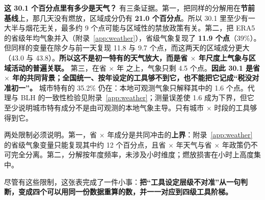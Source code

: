\textbf{这 30.1 个百分点里有多少是天气？} 有三条证据。第一，把同样的分解用在\textbf{节前基线}上，那几天没有燃放，区域成分仍有 \textbf{21.0 个百分点}。所以 30.1 里至少有一大半与烟花无关，最多约 9 个点可能与区域性的禁放政策有关。第二，把 ERA5 的省级年均气象并入（附录~\ref{app:weather}），省级气象复现了 \textbf{11.9 个点}（39\%）。但同样的变量在除夕与前一天复现 11.8 与 9.7 个点，而这两天的区域成分更大（43.0 与 43.8）。\textbf{所以这不是初一特有的天气放大，而是省 $\times$ 年尺度上气象与区域活动的普遍关联。} 第三，在省 $\times$ 年 \NOtwo{} 之上，气象只剩 4.5 个点。\textbf{因此 30.1 是省 $\times$ 年的共同背景；全国统一、按年设定的工具够不到它，也不能把它记成“税没对准初一”。} 城市特有的 35.2\% 仍在：本地可观测气象只解释其中的 1.6 个点。代理与 BLH 的一致性检验见附录~\ref{app:weather}；测量误差使 1.6 成为下界，但它至少说明城市特有成分不是由可观测的本地气象主导。只有城市 $\times$ 时段的工具够得到它。

两处限制必须说明。第一，省 $\times$ 年成分是共同冲击的\textbf{上界}：附录~\ref{app:weather} 的省级气象变量只能复现其中约 12 个百分点，且省 $\times$ 年天气与省 $\times$ 年政策仍不可完全分离。第二，分解按年度频率，未涉及小时维度；燃放损害在小时上高度集中。

尽管有这些限制，这张表完成了一件小事：\textbf{把“工具设定层级不对准”从一句判断，变成四个可以用同一份数据重算的数，并一一对应到四级工具阶梯。}

